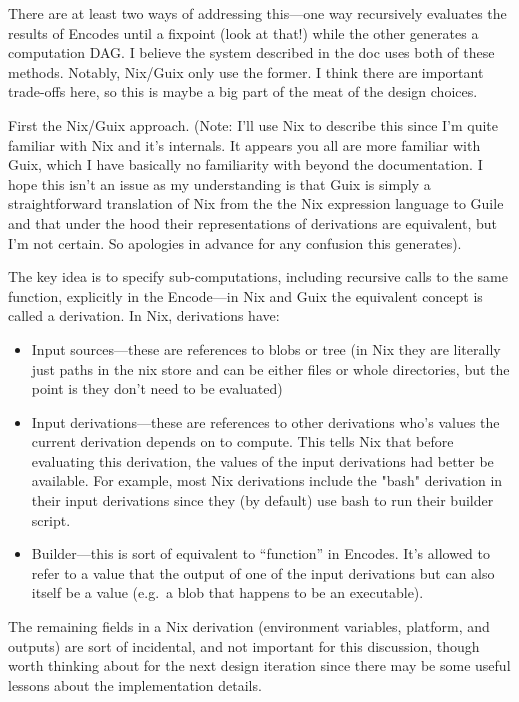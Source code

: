 \documentclass{article}
\newcommand{\bs}{\vspace{\baselineskip}}
\begin{document}
\bs

There are at least two ways of addressing this---one way recursively
evaluates the results of Encodes until a fixpoint (look at that!)
while the other generates a computation DAG. I believe the system
described in the doc uses both of these methods. Notably, Nix/Guix
only use the former. I think there are important trade-offs here, so
this is maybe a big part of the meat of the design choices.

\bs

First the Nix/Guix approach. (Note: I'll use Nix to describe this
since I'm quite familiar with Nix and it's internals. It appears you
all are more familiar with Guix, which I have basically no familiarity
with beyond the documentation. I hope this isn't an issue as my
understanding is that Guix is simply a straightforward translation of
Nix from the the Nix expression language to Guile and that under the
hood their representations of derivations are equivalent, but I'm not
certain. So apologies in advance for any confusion this generates).

\bs

The key idea is to specify sub-computations, including recursive calls
to the same function, explicitly in the Encode---in Nix and Guix the
equivalent concept is called a derivation. In Nix, derivations have:

\begin{itemize}

\item    Input sources---these are references to blobs or tree (in Nix they are literally just paths in the nix store and can be either files or whole directories, but the point is they don't need to be evaluated)
\item Input derivations---these are references to other derivations who's values the current derivation depends on to compute. This tells Nix that before evaluating this derivation, the values of the input derivations had better be available. For example, most Nix derivations include the "bash" derivation in their input derivations since they (by default) use bash to run their builder script.
\item    Builder---this is sort of equivalent to ``function'' in Encodes. It's allowed to refer to a value that the output of one of the input derivations but can also itself be a value (e.g.~a blob that happens to be an executable).
\end{itemize}

The remaining fields in a Nix derivation (environment variables,
platform, and outputs) are sort of incidental, and not important for
this discussion, though worth thinking about for the next design
iteration since there may be some useful lessons about the
implementation details.
\end{document}
